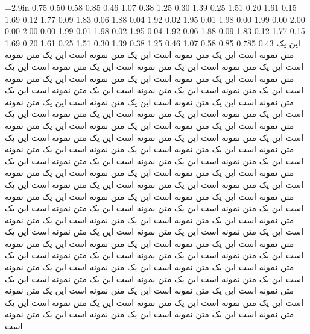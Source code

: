 \documentclass{minimal}
\begin{document}
 =2.9in \parindent0pt
  0.75   0.50
  0.58   0.85
  0.46   1.07
  0.38   1.25
  0.30   1.39
  0.25   1.51
  0.20   1.61
  0.15   1.69
  0.12   1.77
  0.09   1.83
  0.06   1.88
  0.04   1.92
  0.02   1.95
  0.01   1.98
  0.00   1.99
  0.00   2.00
  0.00   2.00
  0.00   1.99
  0.01   1.98
  0.02   1.95
  0.04   1.92
  0.06   1.88
  0.09   1.83
  0.12   1.77
  0.15   1.69
  0.20   1.61
  0.25   1.51
  0.30   1.39
  0.38   1.25
  0.46   1.07
  0.58   0.85
  0.785   0.43
\baselineskip=12.5pt
\parfillskip=0pt
این یک متن نمونه است  این یک متن نمونه است این یک متن نمونه است این یک متن نمونه است این یک متن نمونه است این یک متن نمونه است این یک متن نمونه است این یک متن نمونه است این یک متن نمونه است این یک متن نمونه است این یک متن نمونه است این یک متن نمونه است این یک متن نمونه است این یک متن نمونه است این یک متن نمونه است این یک متن نمونه است این یک متن نمونه است این یک متن نمونه است این یک متن نمونه است این یک متن نمونه است این یک متن نمونه است این یک متن نمونه است این یک متن نمونه است این یک متن نمونه است این یک متن نمونه است این یک متن نمونه است این یک متن نمونه است 
این یک متن نمونه است  این یک متن نمونه است این یک متن نمونه است این یک متن نمونه است این یک متن نمونه است این یک متن نمونه است این یک متن نمونه است این یک متن نمونه است این یک متن نمونه است این یک متن نمونه است این یک متن نمونه است این یک متن نمونه است این یک متن نمونه است این یک متن نمونه است این یک متن نمونه است این یک متن نمونه است این یک متن نمونه است این یک متن نمونه است این یک متن نمونه است این یک متن نمونه است این یک متن نمونه است این یک متن نمونه است این یک متن نمونه است این یک متن نمونه است این یک متن نمونه است این یک متن نمونه است این یک متن نمونه است 
این یک متن نمونه است  این یک متن نمونه است این یک متن نمونه است این یک متن نمونه است این یک متن نمونه است این یک متن نمونه است این یک متن نمونه است این یک متن نمونه است این یک متن نمونه است این یک متن نمونه است این یک متن نمونه است این یک متن نمونه است این یک متن نمونه است این یک متن نمونه است این یک متن نمونه است این یک متن نمونه است این یک متن نمونه است این یک متن نمونه است این یک متن نمونه است این یک متن نمونه است این یک متن نمونه است این یک متن نمونه است این یک متن نمونه است این یک متن نمونه است این یک متن نمونه است این یک متن نمونه است این یک متن نمونه است 
\end{document}
